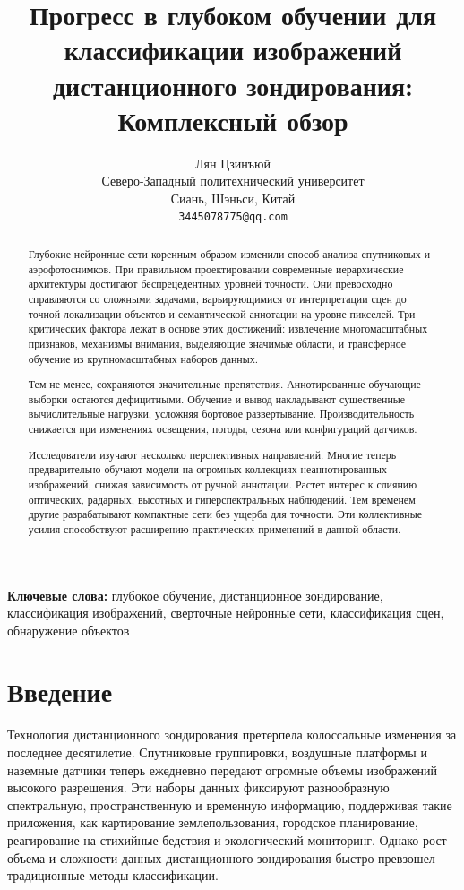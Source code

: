 \documentclass[12pt,a4paper]{article}
\title{\fontsize{14}{17}\selectfont\textbf{Прогресс в глубоком обучении для классификации изображений дистанционного зондирования: Комплексный обзор}}
\author{Лян Цзинъюй\\
        Северо-Западный политехнический университет\\
        Сиань, Шэньси, Китай\\
        \texttt{3445078775@qq.com}}
\date{}
\begin{document}
\maketitle

\begin{abstract}
Глубокие нейронные сети коренным образом изменили способ анализа спутниковых и аэрофотоснимков. При правильном проектировании современные иерархические архитектуры достигают беспрецедентных уровней точности. Они превосходно справляются со сложными задачами, варьирующимися от интерпретации сцен до точной локализации объектов и семантической аннотации на уровне пикселей. Три критических фактора лежат в основе этих достижений: извлечение многомасштабных признаков, механизмы внимания, выделяющие значимые области, и трансферное обучение из крупномасштабных наборов данных.

Тем не менее, сохраняются значительные препятствия. Аннотированные обучающие выборки остаются дефицитными. Обучение и вывод накладывают существенные вычислительные нагрузки, усложняя бортовое развертывание. Производительность снижается при изменениях освещения, погоды, сезона или конфигураций датчиков.

Исследователи изучают несколько перспективных направлений. Многие теперь предварительно обучают модели на огромных коллекциях неаннотированных изображений, снижая зависимость от ручной аннотации. Растет интерес к слиянию оптических, радарных, высотных и гиперспектральных наблюдений. Тем временем другие разрабатывают компактные сети без ущерба для точности. Эти коллективные усилия способствуют расширению практических применений в данной области.
\end{abstract}

\textbf{Ключевые слова:} глубокое обучение, дистанционное зондирование, классификация изображений, сверточные нейронные сети, классификация сцен, обнаружение объектов

\section{Введение}
\label{sec:introduction}
Технология дистанционного зондирования претерпела колоссальные изменения за последнее десятилетие. Спутниковые группировки, воздушные платформы и наземные датчики теперь ежедневно передают огромные объемы изображений высокого разрешения. Эти наборы данных фиксируют разнообразную спектральную, пространственную и временную информацию, поддерживая такие приложения, как картирование землепользования, городское планирование, реагирование на стихийные бедствия и экологический мониторинг. Однако рост объема и сложности данных дистанционного зондирования быстро превзошел традиционные методы классификации.
\end{document}
